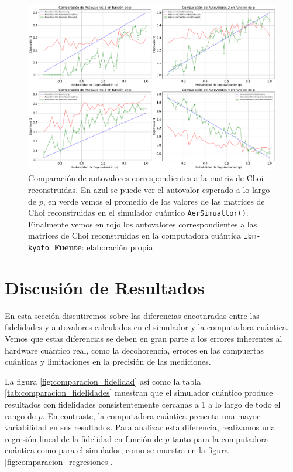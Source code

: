\documentclass[letterpaper,12pt]{thesisECFM}
\theoremstyle{plain}
\theoremstyle{definition}
\theoremstyle{remark}
\newcommand{\1}{\mathbb{1}}
\begin{document}
\begin{figure}[h!] 
    \centering 
    \includegraphics[width=0.90 \linewidth]{imagenes/eigenvalores_comparacion.png}
    \caption{Comparación de autovalores correspondientes a la matriz de Choi reconstruidas. En azul se puede ver el autovalor esperado a lo largo de $p$, en verde vemos el promedio de los valores de las matrices de Choi reconstruidas  en el simulador cuántico \texttt{AerSimualtor()}. Finalmente vemos en rojo los autovalores correspondientes a las matrices de Choi reconstruidas en la computadora cuántica \texttt{ibm-kyoto}. \textbf{Fuente}: elaboración propia. }
    \label{fig:comparacion_autovalores}
\end{figure}

\section{Discusión de Resultados}
En esta sección discutiremos sobre las diferencias encotnradas entre las fidelidades y autovalores calculados en el simulador y la computadora cuántica. Vemos que estas diferencias se deben en gran parte a los errores inherentes al hardware cuántico real, como la decohorencia, errores en las compuertas cuánticas y limitaciones en la precisión de las mediciones. 

La figura \ref{fig:comparacion_fidelidad} así como la tabla \ref{tab:comparacion_fidelidades} muestran que el simulador cuántico produce resultados con fidelidades consistentemente cercanas a 1 a lo largo de todo el rango de $p$. En contraste, la computadora cuántica presenta una mayor variabilidad en sus resultados. Para analizar esta diferencia, realizamos una regresión lineal de la fidelidad en función de $p$ tanto para la computadora cuántica como para el simulador, como se muestra en la figura \ref{fig:comparacion_regresiones}.
\end{document}

